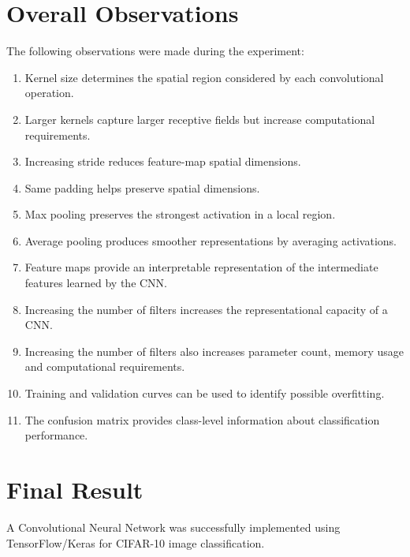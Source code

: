 \documentclass[11pt]{article}
\begin{document}
\section{Overall Observations}
The following observations were made during the experiment:
\begin{enumerate}
    \item Kernel size determines the spatial region considered by each convolutional operation.
    \item Larger kernels capture larger receptive fields but increase computational requirements.
    \item Increasing stride reduces feature-map spatial dimensions.
    \item Same padding helps preserve spatial dimensions.
    \item Max pooling preserves the strongest activation in a local region.
    \item Average pooling produces smoother representations by averaging activations.
    \item Feature maps provide an interpretable representation of the intermediate features learned by the CNN.
    \item Increasing the number of filters increases the representational capacity of a CNN.
    \item Increasing the number of filters also increases parameter count, memory usage and computational requirements.
    \item Training and validation curves can be used to identify possible overfitting.
    \item The confusion matrix provides class-level information about classification performance.
\end{enumerate}

\section{Final Result}
A Convolutional Neural Network was successfully implemented using TensorFlow/Keras for CIFAR-10 image classification.
\end{document}
